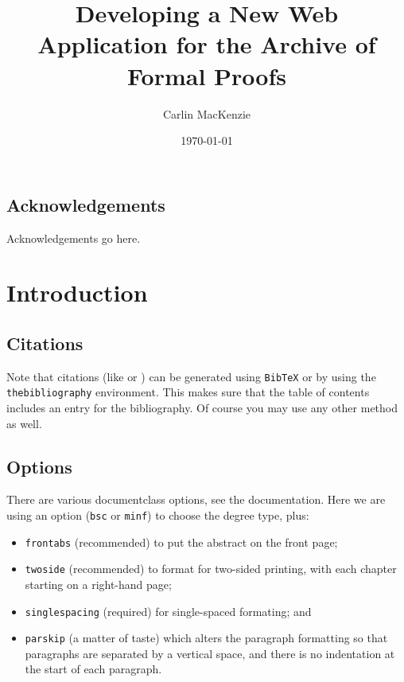 \documentclass[bsc,frontabs,twoside,singlespacing,parskip,deptreport]{infthesis}
\begin{document}
\title{Developing a New Web Application for the Archive of Formal Proofs}

\author{Carlin MacKenzie}



\date{\today}


\maketitle

\section*{Acknowledgements}
Acknowledgements go here. 

\tableofcontents



\chapter{Introduction}

\section{Citations}

Note that citations 
(like \cite{Wenzel2019} or \cite{Goodwin2020})
can be generated using {\tt BibTeX} or by using the
{\tt thebibliography} environment. This makes sure that the
table of contents includes an entry for the bibliography.
Of course you may use any other method as well.

\section{Options}

There are various documentclass options, see the documentation.  Here we are
using an option ({\tt bsc} or {\tt minf}) to choose the degree type, plus:
\begin{itemize}
\item {\tt frontabs} (recommended) to put the abstract on the front page;
\item {\tt twoside} (recommended) to format for two-sided printing, with
  each chapter starting on a right-hand page;
\item {\tt singlespacing} (required) for single-spaced formating; and
\item {\tt parskip} (a matter of taste) which alters the paragraph formatting so that
paragraphs are separated by a vertical space, and there is no
indentation at the start of each paragraph.
\end{itemize}
\end{document}
